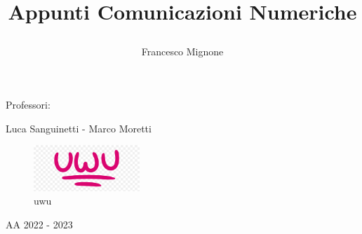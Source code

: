 \title{\bf Appunti Comunicazioni Numeriche \par}
\author{Francesco Mignone}
\date{}
\begin{titlepage}

    \maketitle    

    \begin{center}
        Professori:


        Luca Sanguinetti - Marco Moretti

        \vfill
        \begin{figure}[htp]
            \centering
            \includegraphics[width=4cm]{media/uwu.png}
            \caption{uwu}
            \label{fig:galaxy}
        \end{figure}
        AA 2022 - 2023
    \end{center}

\end{titlepage}
